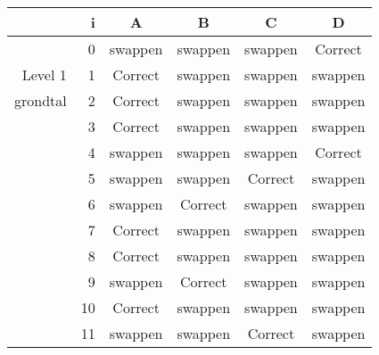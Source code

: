 \begin{tabular}{ rr| c|c|c|c}\hline\hline
     & i & \textbf{A} & \textbf{B} & \textbf{C} & \textbf{D}\\\hline

&0&swappen&swappen&swappen&Correct\cellcolor[gray]{0.6}\\
Level 1 & 1&Correct\cellcolor[gray]{0.6}&swappen&swappen&swappen\\
grondtal &2&Correct\cellcolor[gray]{0.6}&swappen&swappen&swappen\\
&3&Correct\cellcolor[gray]{0.6}&swappen&swappen&swappen\\
&4&swappen&swappen&swappen&Correct\cellcolor[gray]{0.6}\\
&5&swappen&swappen&Correct\cellcolor[gray]{0.6}&swappen\\
&6&swappen&Correct\cellcolor[gray]{0.6}&swappen&swappen\\
&7&Correct\cellcolor[gray]{0.6}&swappen&swappen&swappen\\
&8&Correct\cellcolor[gray]{0.6}&swappen&swappen&swappen\\
&9&swappen&Correct\cellcolor[gray]{0.6}&swappen&swappen\\
&10&Correct\cellcolor[gray]{0.6}&swappen&swappen&swappen\\
&11&swappen&swappen&Correct\cellcolor[gray]{0.6}&swappen\\
\hline\end{tabular}\par\ \newline

